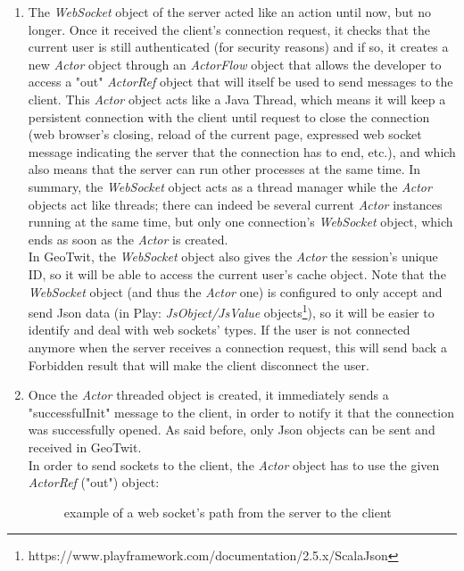 \documentclass[a4paper,11pt]{report}
\begin{document}
\begin{enumerate}
	\item The \emph{WebSocket} object of the server acted like an action until now, but no longer. Once it received the client's connection request, it checks that the current user is still authenticated (for security reasons) and if so, it creates a new \emph{Actor} object through an \emph{ActorFlow} object that allows the developer to access a "out" \emph{ActorRef} object that will itself be used to send messages to the client. This \emph{Actor} object acts like a Java Thread, which means it will keep a persistent connection with the client until request to close the connection (web browser's closing, reload of the current page, expressed web socket message indicating the server that the connection has to end, etc.), and which also means that the server can run other processes at the same time. In summary, the \emph{WebSocket} object acts as a thread manager while the \emph{Actor} objects act like threads; there can indeed be several current \emph{Actor} instances running at the same time, but only one connection's \emph{WebSocket} object, which ends as soon as the \emph{Actor} is created.\\
	In GeoTwit, the \emph{WebSocket} object also gives the \emph{Actor} the session's unique ID, so it will be able to access the current user's cache object. Note that the \emph{WebSocket} object (and thus the \emph{Actor} one) is configured to only accept and send Json data (in Play: \emph{JsObject/JsValue} objects\footnote{https://www.playframework.com/documentation/2.5.x/ScalaJson}), so it will be easier to identify and deal with web sockets' types. If the user is not connected anymore when the server receives a connection request, this will send back a Forbidden result that will make the client disconnect the user.
	\item Once the \emph{Actor} threaded object is created, it immediately sends a "successfulInit" message to the client, in order to notify it that the connection was successfully opened. As said before, only Json objects can be sent and received in GeoTwit.\\
	
	In order to send sockets to the client, the \emph{Actor} object has to use the given \emph{ActorRef} ("out") object:
	\begin{figure}[H]
	\vspace{-5pt}
	\begin{center}
	\vspace{-5pt}
	\caption{example of a web socket's path from the server to the client}
	\end{center}
	\end{figure}
	\vspace{-20pt}


\end{enumerate}
\end{document}
